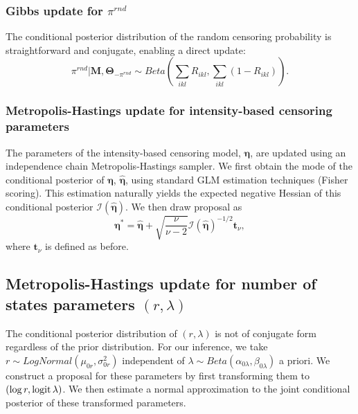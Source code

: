 \subsubsection{Gibbs update for $\pi^{rnd}$}

The conditional posterior distribution of the random censoring probability is straightforward and conjugate, enabling a direct update:
\begin{equation*}
\pi^{rnd} | \bm M, \bm \Theta_{-\pi^{rnd}} \sim Beta\left( \sum_{ikl} R_{ikl}, \sum_{ikl} (1 - R_{ikl}) \right) .
\end{equation*}


\subsubsection{Metropolis-Hastings update for intensity-based censoring parameters}

The parameters of the intensity-based censoring model, $\bm \eta$,
are updated using an independence chain Metropolis-Hastings sampler.
%
We first obtain the mode of the conditional posterior of $\bm \eta$, $\hat{\bm \eta}$, using standard GLM estimation techniques (Fisher scoring).
This estimation naturally yields the expected negative Hessian of this conditional posterior $\mathcal{I}(\hat{\bm{\eta}})$.
We then draw proposal as
\begin{equation*}
\bm{\eta}^* = \hat{\bm{\eta}} + \sqrt{\frac{\nu}{\nu - 2}} \mathcal{I}(\hat{\bm{\eta}})^{-1/2} \bm{t}_\nu,
\end{equation*}
where $\bm{t}_\nu$ is defined as before.


\subsection{Metropolis-Hastings update for number of states parameters $(r, \lambda)$}
\label{sec:draw_number_of_states_hyperparameters}

The conditional posterior distribution of $(r, \lambda)$ is not of conjugate form regardless of the prior distribution.
For our inference, we take $r \sim LogNormal(\mu_{0r}, \sigma^2_{0r})$ independent of $\lambda \sim Beta(\alpha_{0\lambda}, \beta_{0\lambda})$ a priori.
We construct a proposal for these parameters by first transforming them to $(\log r, \operatorname{logit} \lambda)$.
We then estimate a normal approximation to the joint conditional posterior of these transformed parameters.

